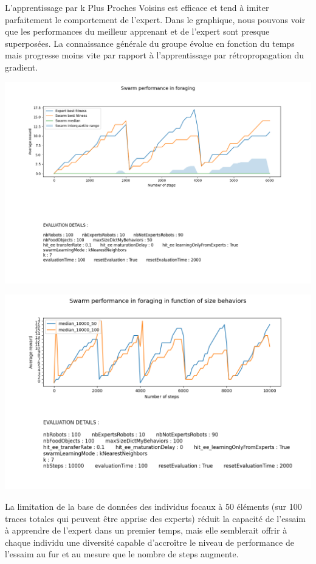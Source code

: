 \documentclass[a4paper, 12pt]{report}
\begin{document}
    L'apprentissage par k Plus Proches Voisins est efficace et tend à imiter parfaitement le comportement de l'expert.
    Dans le graphique, nous pouvons voir que les performances du meilleur apprenant et de l'expert sont presque superposées. La connaissance générale du groupe évolue en fonction du temps mais progresse moins vite par rapport à l'apprentissage par rétropropagation du gradient.
    
    \includegraphics[scale=0.5]{knn6000_50.png}
    
    \includegraphics[scale=0.5]{images/data_sizeDB_10000_knn.png}
    
    La limitation de la base de données des individus focaux à 50 éléments (sur 100 traces totales qui peuvent être apprise des experts) réduit la capacité de l'essaim à apprendre de l'expert dans un premier temps, mais elle semblerait offrir à chaque individu une diversité capable d'accroître le niveau de performance de l'essaim au fur et au mesure que le nombre de steps augmente. 
    
\end{document}
